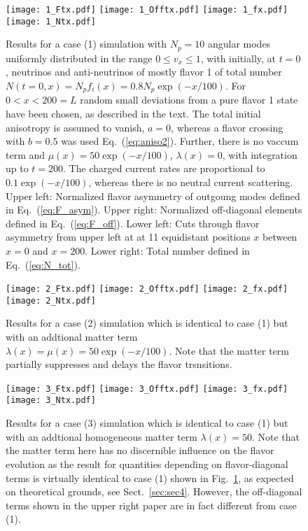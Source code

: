 \documentclass[prd,aps]{revtex4-2}
\begin{document}
\begin{figure}[p]
\texttt{[image: 1\_Ftx.pdf]}
\texttt{[image: 1\_Offtx.pdf]}
\texttt{[image: 1\_fx.pdf]}
\texttt{[image: 1\_Ntx.pdf]}
\caption[...]{Results for a case (1) simulation with $N_p=10$ angular modes uniformly distributed in the range $0\leq v_x\leq1$, with
initially, at $t=0$, neutrinos and anti-neutrinos of mostly flavor 1
of total number $N(t=0,x)=N_pf_i(x)=0.8N_p\exp(-x/100)$. For $0<x<200=L$ random small deviations from a pure flavor 1 state have
been chosen, as described in the text. The total initial anisotropy is assumed to vanish, $a=0$, whereas a flavor crossing with $b=0.5$
was used Eq.~(\ref{eq:aniso2}). Further, there is no vaccum term and $\mu(x)=50\exp(-x/100)$, $\lambda(x)=0$,
with integration up to $t=200$. The charged current rates are proportional to $0.1\exp(-x/100)$, whereas there is no
neutral current scattering. Upper left: Normalized flavor asymmetry of outgoung modes defined in Eq.~(\ref{eq:F_asym}).
Upper right: Normalized off-diagonal elements defined in Eq.~(\ref{eq:F_off}). Lower left: Cuts through flavor asymmetry from upper left at
at 11 equidistant positions $x$ between $x=0$ and $x=200$. Lower right: Total number defined in Eq.~(\ref{eq:N_tot}).}
\label{fig:1}
\end{figure}

\begin{figure}[p]
\texttt{[image: 2\_Ftx.pdf]}
\texttt{[image: 2\_Offtx.pdf]}
\texttt{[image: 2\_fx.pdf]}
\texttt{[image: 2\_Ntx.pdf]}
\caption[...]{Results for a case (2) simulation which is identical to case (1) but with an addtional matter term
$\lambda(x)=\mu(x)=50\exp(-x/100)$. Note that the matter term partially suppresses and delays the flavor trsnsitions.}
\label{fig:2}
\end{figure}

\begin{figure}[p]
\texttt{[image: 3\_Ftx.pdf]}
\texttt{[image: 3\_Offtx.pdf]}
\texttt{[image: 3\_fx.pdf]}
\texttt{[image: 3\_Ntx.pdf]}
\caption[...]{Results for a case (3) simulation which is identical to case (1) but with an addtional homogeneous matter term
$\lambda(x)=50$. Note that the matter term here has no discernible influence on the flavor evolution as the result for quantities
depending on flavor-diagonal terms is virtually identical to case (1) shown in Fig.~\ref{fig:1}, as expected on theoretical
grounds, see Sect.~\ref{sec:sec4}. However, the off-diagonal terms shown in the upper right paper are in fact different from case (1).}
\label{fig:3}
\end{figure}
\end{document}
